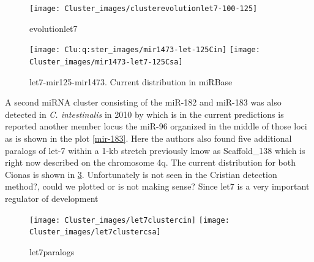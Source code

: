 \documentclass[11pt]{article}
\newcommand{\CAVH}[1]{\begingroup\color{red}#1\endgroup}
\begin{document}
 
\begin{figure}[htb!]
\centering
\texttt{[image: Cluster\_images/clusterevolutionlet7-100-125]} 
\caption{evolutionlet7}
\label{evolutionlet7}
\end{figure}

\begin{figure}[htb!]
\centering
\texttt{[image: Clu:q:ster\_images/mir1473-let-125Cin]} \quad 
\texttt{[image: Cluster\_images/mir1473-let7-125Csa]} 
\caption{let7-mir125-mir1473. Current distribution in miRBase}
\label{let7-mir125-mir1473}
\end{figure}



A second miRNA cluster consisting of the miR-182 and miR-183 was also detected in \textit{C. intestinalis} in 2010 by \cite{Keshavan2010} which is in the current predictions is reported another member locus the miR-96 organized in the middle of those loci as is shown in the plot \ref{mir-183}. Here the authors also found five additional paralogs of let-7 within a 1-kb stretch previously know as Scaffold\_138 which is right now described on the chromosome 4q. The current distribution for both Cionas is shown in \ref{let7paralogs}. \CAVH{Unfortunately is not seen in the Cristian detection method?, could we plotted or is not making sense? Since let7 is a very important regulator of development}

\begin{figure}[htb!]
\centering
\texttt{[image: Cluster\_images/let7clustercin]} \quad \texttt{[image: Cluster\_images/let7clustercsa]} 
\caption{let7paralogs}
\label{let7paralogs}
\end{figure}
\end{document}
